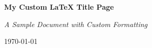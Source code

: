 \documentclass{article}
\begin{document}
	
\begin{titlepage} %
	\centering
	\huge
	\textbf{My Custom LaTeX Title Page}
	
	\vspace{1cm} %
	\normalsize
	\textit{A Sample Document with Custom Formatting}
	
	\vfill %
	\large
	\today
\end{titlepage}
\end{document}

